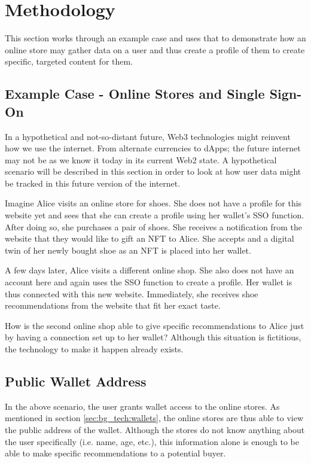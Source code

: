 \chapter{Methodology}
\label{ch:methodology}
This section works through an example case and uses that to demonstrate how an online store may gather data on a user and thus create a profile of them to create specific, targeted content for them.


%
%
\section{Example Case - Online Stores and Single Sign-On}
\label{sec:methodology:caseStudy}
In a hypothetical and not-so-distant future, Web3 technologies might reinvent how we use the internet. From alternate currencies to dApps; the future internet may not be as we know it today in its current Web2 state. A hypothetical scenario will be described in this section in order to look at how user data might be tracked in this future version of the internet.

Imagine Alice visits an online store for shoes. She does not have a profile for this website yet and sees that she can create a profile using her wallet's SSO function. After doing so, she purchases a pair of shoes. She receives a notification from the website that they would like to gift an NFT to Alice. She accepts and a digital twin of her newly bought shoe as an NFT is placed into her wallet.

A few days later, Alice visits a different online shop. She also does not have an account here and again uses the SSO function to create a profile. Her wallet is thus connected with this new website. Immediately, she receives shoe recommendations from the website that fit her exact taste.

How is the second online shop able to give specific recommendations to Alice just by having a connection set up to her wallet? Although this situation is fictitious, the technology to make it happen already exists.


%
%
\section{Public Wallet Address}
\label{sec:methodology:address}
In the above scenario, the user grants wallet access to the online stores. As mentioned in section \ref{sec:bg_tech:wallets}, the online stores are thus able to view the public address of the wallet. Although the stores do not know anything about the user specifically (i.e. name, age, etc.), this information alone is enough to be able to make specific recommendations to a potential buyer.

